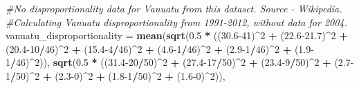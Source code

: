 \documentclass[11pt, oneside]{article}   	%
\newenvironment{Shaded}{\begin{snugshade}}{\end{snugshade}}
\newcommand{\CommentTok}[1]{\textcolor[rgb]{0.56,0.35,0.01}{\textit{#1}}}
\newcommand{\DecValTok}[1]{\textcolor[rgb]{0.00,0.00,0.81}{#1}}
\newcommand{\FloatTok}[1]{\textcolor[rgb]{0.00,0.00,0.81}{#1}}
\newcommand{\KeywordTok}[1]{\textcolor[rgb]{0.13,0.29,0.53}{\textbf{#1}}}
\newcommand{\NormalTok}[1]{#1}
\newcommand{\OperatorTok}[1]{\textcolor[rgb]{0.81,0.36,0.00}{\textbf{#1}}}
\newcommand{\StringTok}[1]{\textcolor[rgb]{0.31,0.60,0.02}{#1}}
\begin{document}
\begin{Shaded}
\begin{Highlighting}[]
{{{{{{\CommentTok{#No disproportionality data for Vanuatu from this dataset. Source - Wikipedia.}
\CommentTok{#Calculating Vanuatu disproportionality from 1991-2012, without data for 2004. }
\NormalTok{vanuatu_disproportionality =}\StringTok{ }\KeywordTok{mean}\NormalTok{(}\KeywordTok{sqrt}\NormalTok{(}\FloatTok{0.5} \OperatorTok{*}\StringTok{ }\NormalTok{((}\FloatTok{30.6}\DecValTok{-41}\NormalTok{)}\OperatorTok{^}\DecValTok{2} \OperatorTok{+}\StringTok{ }\NormalTok{(}\FloatTok{22.6-21.7}\NormalTok{)}\OperatorTok{^}\DecValTok{2} \OperatorTok{+}\StringTok{ }
\StringTok{                                                }\NormalTok{(}\FloatTok{20.4}\DecValTok{-10}\OperatorTok{/}\DecValTok{46}\NormalTok{)}\OperatorTok{^}\DecValTok{2} \OperatorTok{+}\StringTok{ }
\StringTok{                                                }\NormalTok{(}\FloatTok{15.4}\DecValTok{-4}\OperatorTok{/}\DecValTok{46}\NormalTok{)}\OperatorTok{^}\DecValTok{2} \OperatorTok{+}\StringTok{ }\NormalTok{(}\FloatTok{4.6}\DecValTok{-1}\OperatorTok{/}\DecValTok{46}\NormalTok{)}\OperatorTok{^}\DecValTok{2} \OperatorTok{+}\StringTok{ }
\StringTok{                                                }\NormalTok{(}\FloatTok{2.9}\DecValTok{-1}\OperatorTok{/}\DecValTok{46}\NormalTok{)}\OperatorTok{^}\DecValTok{2} \OperatorTok{+}\StringTok{ }\NormalTok{(}\FloatTok{1.9}\DecValTok{-1}\OperatorTok{/}\DecValTok{46}\NormalTok{)}\OperatorTok{^}\DecValTok{2}\NormalTok{)),}
                                  \KeywordTok{sqrt}\NormalTok{(}\FloatTok{0.5} \OperatorTok{*}\StringTok{ }\NormalTok{((}\FloatTok{31.4}\DecValTok{-20}\OperatorTok{/}\DecValTok{50}\NormalTok{)}\OperatorTok{^}\DecValTok{2} \OperatorTok{+}\StringTok{ }\NormalTok{(}\FloatTok{27.4}\DecValTok{-17}\OperatorTok{/}\DecValTok{50}\NormalTok{)}\OperatorTok{^}\DecValTok{2} \OperatorTok{+}
\StringTok{                                                }\NormalTok{(}\FloatTok{23.4}\DecValTok{-9}\OperatorTok{/}\DecValTok{50}\NormalTok{)}\OperatorTok{^}\DecValTok{2} \OperatorTok{+}\StringTok{ }
\StringTok{                                                }\NormalTok{(}\FloatTok{2.7}\DecValTok{-1}\OperatorTok{/}\DecValTok{50}\NormalTok{)}\OperatorTok{^}\DecValTok{2} \OperatorTok{+}\StringTok{ }\NormalTok{(}\FloatTok{2.3}\DecValTok{-0}\NormalTok{)}\OperatorTok{^}\DecValTok{2} \OperatorTok{+}
\StringTok{                                                }\NormalTok{(}\FloatTok{1.8}\DecValTok{-1}\OperatorTok{/}\DecValTok{50}\NormalTok{)}\OperatorTok{^}\DecValTok{2} \OperatorTok{+}\StringTok{ }\NormalTok{(}\FloatTok{1.6}\DecValTok{-0}\NormalTok{)}\OperatorTok{^}\DecValTok{2}\NormalTok{)), }
}}}}}}
\end{Highlighting}
\end{Shaded}
\end{document}
